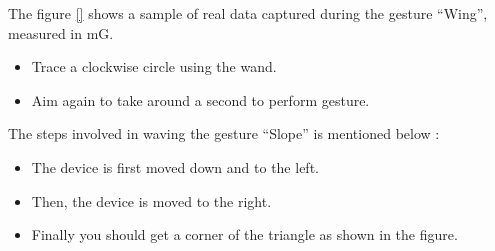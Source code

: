 The figure \ref{} shows a sample of real data captured during the gesture ``Wing'', measured in mG.  

\begin{center}
\end{center}

\begin{itemize}
    \item Trace a clockwise circle using the wand.
    
    \item Aim again to take around a second to perform gesture.
    
\end{itemize}



The steps involved in waving the gesture ``Slope'' is mentioned below \cite{Warden:2020}:

\begin{center}
\end{center}

\begin{itemize}
    \item The device is first moved down and to the left.
    \item Then, the device is moved to the right.
    \item Finally you should get a corner of the triangle as shown in the figure.
\end{itemize}




